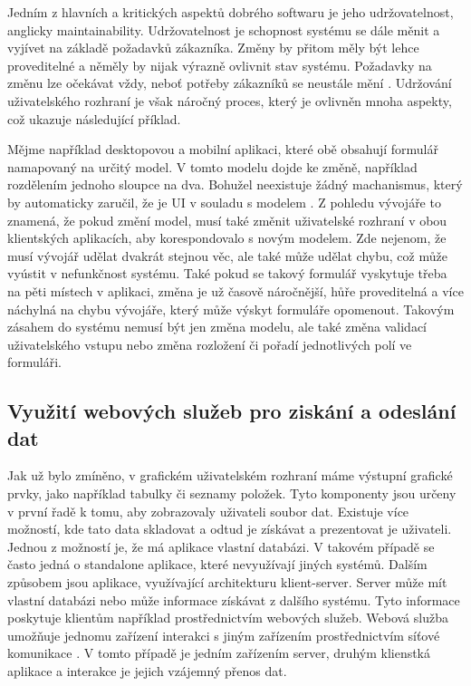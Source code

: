 Jedním z hlavních a kritických aspektů dobrého softwaru je jeho udržovatelnost, anglicky maintainability. Udržovatelnost je schopnost systému se dále měnit a vyjívet na základě požadavků zákazníka. Změny by přitom měly být lehce proveditelné a něměly by nijak výrazně ovlivnit stav systému. Požadavky na změnu lze očekávat vždy, neboť potřeby zákazníků se neustále mění \cite{sommerville}. Udržování uživatelského rozhraní je však náročný proces, který je ovlivněn mnoha aspekty, což ukazuje následující příklad.

Mějme například desktopovou a mobilní aplikaci, které obě obsahují formulář namapovaný na určitý model. V tomto modelu dojde ke změně, například rozdělením jednoho sloupce na dva. Bohužel neexistuje žádný machanismus, který by automaticky zaručil, že je UI v souladu s modelem \cite{cernyTEA}. Z pohledu vývojáře to znamená, že pokud změní model, musí také změnit uživatelské rozhraní v obou klientských aplikacích, aby korespondovalo s novým modelem. Zde nejenom, že musí vývojář udělat dvakrát stejnou věc, ale také může udělat chybu, což může vyústit v nefunkčnost systému. Také pokud se takový formulář vyskytuje třeba na pěti místech v aplikaci, změna je už časově náročnější, hůře proveditelná a více náchylná na chybu vývojáře, který může výskyt formuláře opomenout.
Takovým zásahem do systému nemusí být jen změna modelu, ale také změna validací uživatelského vstupu nebo změna rozložení či pořadí jednotlivých polí ve formuláři.

\subsection{Využití webových služeb pro ziskání a odeslání dat}
Jak už bylo zmíněno, v grafickém uživatelském rozhraní máme výstupní grafické prvky, jako například tabulky či seznamy položek. Tyto komponenty jsou určeny v první řadě k tomu, aby zobrazovaly uživateli soubor dat. Existuje více možností, kde tato data skladovat a odtud je získávat a prezentovat je uživateli. Jednou z možností je, že má aplikace vlastní databázi. V takovém případě se často jedná o standalone aplikace, které nevyužívají jiných systémů. Dalším způsobem jsou aplikace, využívající architekturu klient-server. Server může mít vlastní databázi nebo může informace získávat z dalšího systému. Tyto informace poskytuje klientům například prostřednictvím webových služeb. Webová služba umožňuje jednomu zařízení interakci s jiným zařízením prostřednictvím síťové komunikace \cite{wiki-ws}. V tomto případě je jedním zařízením server, druhým klienstká aplikace a interakce je jejich vzájemný přenos dat. 

